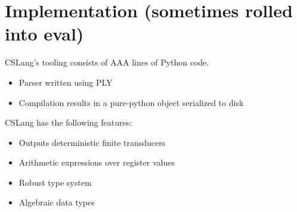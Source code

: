 \section{Implementation (sometimes rolled into eval)}
\label{SEC:implementation}

CSLang's tooling consists of AAA lines of Python code.
\begin{itemize}
\item{Parser written using PLY}
\item{Compilation results in a pure-python object serialized to disk}
\end{itemize}


CSLang has the following features:
\begin{itemize}
\item{Outputs deterministic finite transducers}
\item{Arithmetic expressions over register values}
\item{Robust type system}
\item{Algebraic data types}
\end{itemize}

